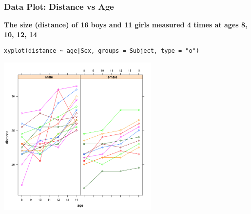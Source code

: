 \documentclass{beamer}
\begin{document}
\begin{frame}[fragile]
    \frametitle{Data Plot: Distance vs Age}
    \textbf{The size (distance) of 16 boys and 11 girls measured 4 times at ages 8, 10, 12, 14}
    \small\begin{Verbatim}[frame=single]
xyplot(distance ~ age|Sex, groups = Subject, type = "o")
    \end{Verbatim}
    \begin{center}
    \includegraphics[width=0.6\textwidth]{lectures/day_6_praxis_and_fitting_of_mems/figures/unnamed-chunk-3-1.png} 
    \end{center}
\end{frame}
\end{document}
